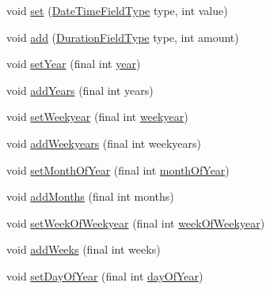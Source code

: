 \begin{DoxyCompactItemize}
void \hyperlink{classorg_1_1joda_1_1time_1_1_mutable_date_time_a6beb6dc00464b7e9b9fc4b0e0c664ab4}{set} (\hyperlink{classorg_1_1joda_1_1time_1_1_date_time_field_type}{Date\-Time\-Field\-Type} type, int value)
\item 
void \hyperlink{classorg_1_1joda_1_1time_1_1_mutable_date_time_aa188d217252f4c70b69df43d05a8d37e}{add} (\hyperlink{classorg_1_1joda_1_1time_1_1_duration_field_type}{Duration\-Field\-Type} type, int amount)
\item 
void \hyperlink{classorg_1_1joda_1_1time_1_1_mutable_date_time_a81830261b335c5110043fa27056a616b}{set\-Year} (final int \hyperlink{classorg_1_1joda_1_1time_1_1_mutable_date_time_a33fe2fd92704573cfd1e0659cf26e0ae}{year})
\item 
void \hyperlink{classorg_1_1joda_1_1time_1_1_mutable_date_time_a0554c8860ac0bfc45b9d5f216f5707e3}{add\-Years} (final int years)
\item 
void \hyperlink{classorg_1_1joda_1_1time_1_1_mutable_date_time_a34518230be655262ddf429a0efc408ca}{set\-Weekyear} (final int \hyperlink{classorg_1_1joda_1_1time_1_1_mutable_date_time_aea22aed78d3f48ffdd9f2fbb8df8b7d5}{weekyear})
\item 
void \hyperlink{classorg_1_1joda_1_1time_1_1_mutable_date_time_a77cc1b56f80be1dce12013c54b1dcc54}{add\-Weekyears} (final int weekyears)
\item 
void \hyperlink{classorg_1_1joda_1_1time_1_1_mutable_date_time_ac114fb10cc2e0d7ed0a8e51f746c0050}{set\-Month\-Of\-Year} (final int \hyperlink{classorg_1_1joda_1_1time_1_1_mutable_date_time_a58a879bcc13ad752006977b73ccb01eb}{month\-Of\-Year})
\item 
void \hyperlink{classorg_1_1joda_1_1time_1_1_mutable_date_time_a7bb0dbdf4c77a549a57c6a8e5d3718fd}{add\-Months} (final int months)
\item 
void \hyperlink{classorg_1_1joda_1_1time_1_1_mutable_date_time_ac95bdda2369129d8e889212f5598a7ba}{set\-Week\-Of\-Weekyear} (final int \hyperlink{classorg_1_1joda_1_1time_1_1_mutable_date_time_a199fb359629e27f0e13af2cfec8d5b6a}{week\-Of\-Weekyear})
\item 
void \hyperlink{classorg_1_1joda_1_1time_1_1_mutable_date_time_a6bfb5f08661108deb9626377ea82a8dd}{add\-Weeks} (final int weeks)
\item 
void \hyperlink{classorg_1_1joda_1_1time_1_1_mutable_date_time_aecded156cc074c7202529c4dec1e2970}{set\-Day\-Of\-Year} (final int \hyperlink{classorg_1_1joda_1_1time_1_1_mutable_date_time_a2c957e91775ea29c90fd67618f1be91e}{day\-Of\-Year})
\item 

\end{DoxyCompactItemize}
